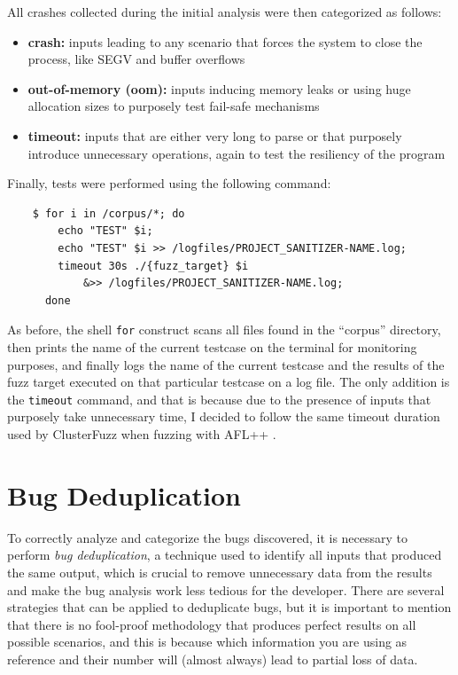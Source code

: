 \newpage
All crashes collected during the initial analysis were then categorized as follows:
\begin{itemize}
    \item \textbf{crash:} inputs leading to any scenario that forces the system to close the process, like SEGV and buffer overflows
    \item \textbf{out-of-memory (oom):} inputs inducing memory leaks or using huge allocation sizes to purposely test fail-safe mechanisms
    \item \textbf{timeout:} inputs that are either very long to parse or that purposely introduce unnecessary operations, again to test the resiliency of the program 
\end{itemize}

Finally, tests were performed using the following command:
\begin{verbatim}
    $ for i in /corpus/*; do 
        echo "TEST" $i; 
        echo "TEST" $i >> /logfiles/PROJECT_SANITIZER-NAME.log; 
        timeout 30s ./{fuzz_target} $i 
            &>> /logfiles/PROJECT_SANITIZER-NAME.log; 
      done
\end{verbatim}
As before, the shell \verb|for| construct scans all files found in the ``corpus'' directory, then prints the name of the current testcase on the terminal for monitoring purposes, and finally logs the name of the current testcase and the results of the fuzz target executed on that particular testcase on a log file. The only addition is the \verb|timeout| command, and that is because due to the presence of inputs that purposely take unnecessary time, I decided to follow the same timeout duration used by ClusterFuzz when fuzzing with AFL++ \cite{timeout}.





\newpage
\section{Bug Deduplication} \label{bug_dedup}
To correctly analyze and categorize the bugs discovered, it is necessary to perform \textit{bug deduplication}, a technique used to identify all inputs that produced the same output, which is crucial to remove unnecessary data from the results and make the bug analysis work less tedious for the developer. There are several strategies that can be applied to deduplicate bugs, but it is important to mention that there is no fool-proof methodology that produces perfect results on all possible scenarios, and this is because which information you are using as reference and their number will (almost always) lead to partial loss of data.

